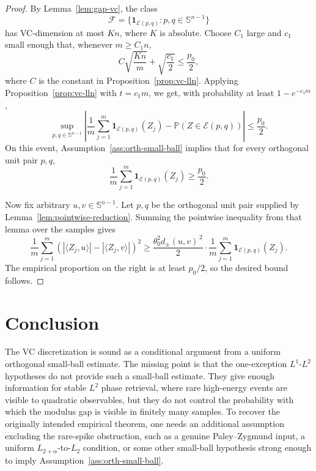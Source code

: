 \documentclass[11pt]{amsart}
\numberwithin{equation}{section}
\theoremstyle{definition}
\theoremstyle{remark}
\newcommand{\Prob}{\mathbb P}
\newcommand{\Sph}{\mathbb S}
\newcommand{\distpm}[2]{d_{\pm}(#1,#2)}
\begin{document}
\begin{proof}
By Lemma~\ref{lem:gap-vc}, the class
\[
\mathcal F=\{\mathbf 1_{\mathcal E(p,q)}:p,q\in\Sph^{n-1}\}
\]
has VC-dimension at most \(K n\), where \(K\) is absolute.  Choose \(C_1\)
large and \(c_1\) small enough that, whenever \(m\ge C_1n\),
\[
C\sqrt{\frac{Kn}{m}}+\sqrt{\frac{c_1}{2}}\le \frac{p_0}{2},
\]
where \(C\) is the constant in Proposition~\ref{prop:vc-lln}.  Applying
Proposition~\ref{prop:vc-lln} with \(t=c_1m\), we get, with probability at
least \(1-e^{-c_1m}\),
\[
\sup_{p,q\in\Sph^{n-1}}
\left|
\frac1m\sum_{j=1}^m\mathbf 1_{\mathcal E(p,q)}(Z_j)
-
\Prob(Z\in\mathcal E(p,q))
\right|
\le \frac{p_0}{2}.
\]
On this event, Assumption~\ref{ass:orth-small-ball} implies that for every
orthogonal unit pair \(p,q\),
\[
\frac1m\sum_{j=1}^m\mathbf 1_{\mathcal E(p,q)}(Z_j)\ge \frac{p_0}{2}.
\]

Now fix arbitrary \(u,v\in\Sph^{n-1}\).  Let \(p,q\) be the orthogonal unit
pair supplied by Lemma~\ref{lem:pointwise-reduction}.  Summing the pointwise
inequality from that lemma over the samples gives
\[
\frac1m\sum_{j=1}^m
\left(
  |\langle Z_j,u\rangle|-|\langle Z_j,v\rangle|
\right)^2
\ge
\frac{\theta_0^2\distpm{u}{v}^{\,2}}{2}
\cdot
\frac1m\sum_{j=1}^m\mathbf 1_{\mathcal E(p,q)}(Z_j).
\]
The empirical proportion on the right is at least \(p_0/2\), so the desired
bound follows.
\end{proof}

\section{Conclusion}

The VC discretization is sound as a conditional argument from a uniform
orthogonal small-ball estimate.  The missing point is that the one-exception
\(L^1\)-\(L^2\) hypotheses do not provide such a small-ball estimate.  They
give enough information for stable \(L^2\) phase retrieval, where rare
high-energy events are visible to quadratic observables, but they do not
control the probability with which the modulus gap is visible in finitely many
samples.  To recover the originally intended empirical theorem, one needs an
additional assumption excluding the rare-spike obstruction, such as a genuine
Paley--Zygmund input, a uniform \(L_{2+\alpha}\)-to-\(L_2\) condition, or some
other small-ball hypothesis strong enough to imply
Assumption~\ref{ass:orth-small-ball}.
\end{document}
